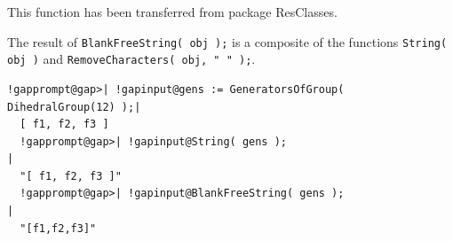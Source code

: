 \documentclass[a4paper,11pt]{report}
\begin{document}
{{{ This function has been transferred from package \textsf{ResClasses}. 

 The result of \texttt{BlankFreeString( obj );} is a composite of the functions \texttt{String( obj )} and \texttt{RemoveCharacters( obj, " " );}. 

 
\begin{Verbatim}[commandchars=!@|,fontsize=\small,frame=single,label=Example]
  !gapprompt@gap>| !gapinput@gens := GeneratorsOfGroup( DihedralGroup(12) );|
  [ f1, f2, f3 ]
  !gapprompt@gap>| !gapinput@String( gens );                                |
  "[ f1, f2, f3 ]"
  !gapprompt@gap>| !gapinput@BlankFreeString( gens );                       |
  "[f1,f2,f3]"
\end{Verbatim}
 }

 }

 }

         
\end{document}

